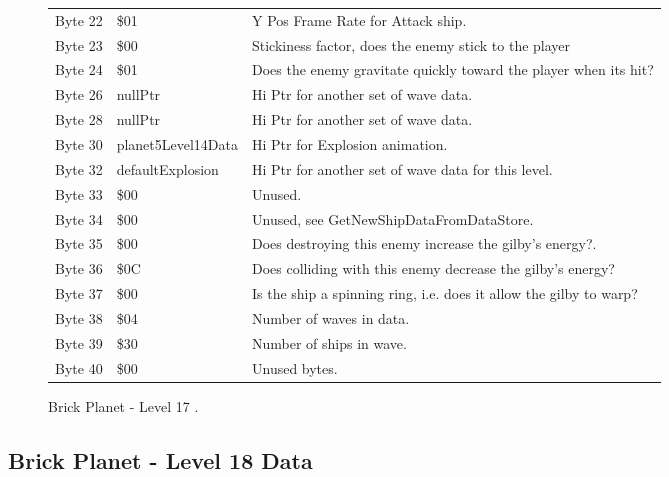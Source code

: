 \begin{figure}[H]
{\begin{adjustbox}{width=12cm}
\begin{tabular}{lll}
 Byte 22 & \$01                & Y Pos Frame Rate for Attack ship.                                  \\
 Byte 23 & \$00                & Stickiness factor, does the enemy stick to the player              \\
 Byte 24 & \$01                & Does the enemy gravitate quickly toward the player when its hit?   \\
 Byte 26 & nullPtr            & Hi Ptr for another set of wave data.                               \\
 Byte 28 & nullPtr            & Hi Ptr for another set of wave data.                               \\
 Byte 30 & planet5Level14Data & Hi Ptr for Explosion animation.                                    \\
 Byte 32 & defaultExplosion   & Hi Ptr for another set of wave data for this level.                \\
 Byte 33 & \$00                & Unused.                                                            \\
 Byte 34 & \$00                & Unused, see GetNewShipDataFromDataStore.                           \\
 Byte 35 & \$00                & Does destroying this enemy increase the gilby's energy?.           \\
 Byte 36 & \$0C                & Does colliding with this enemy decrease the gilby's energy?        \\
 Byte 37 & \$00                & Is the ship a spinning ring, i.e. does it allow the gilby to warp? \\
 Byte 38 & \$04                & Number of waves in data.                                           \\
 Byte 39 & \$30                & Number of ships in wave.                                           \\
 Byte 40 & \$00                & Unused bytes.                                                      \\
\bottomrule
\end{tabular}

  \end{adjustbox}

  }\caption*{Brick Planet - Level 17
.}
\end{figure}

\clearpage
\subsection{Brick Planet - Level 18 Data}

